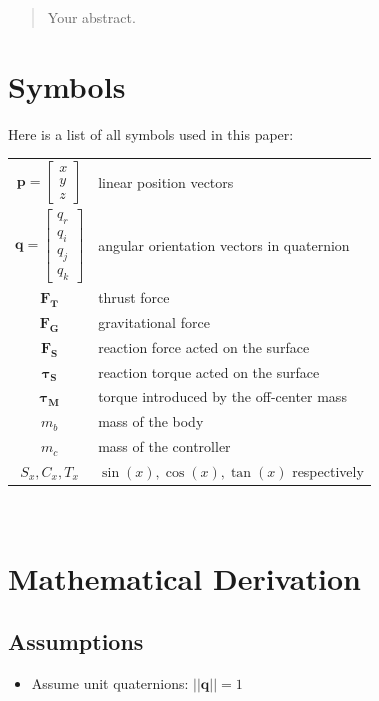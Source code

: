 \begin{abstract}
Your abstract.
\end{abstract}
\section{Symbols}
Here is a list of all symbols used in this paper:
\\
\begin{tabular}{c p{}}
  $\bm{p} = \begin{bmatrix}x \\ y \\ z \end{bmatrix}$ & linear position vectors \\
  $\bm{q} = \begin{bmatrix} q_r \\ q_i \\ q_j \\ q_k \end{bmatrix}$ & angular orientation vectors in quaternion \\
  $\bm{F_{T}}$ & thrust force \\
  $\bm{F_{G}}$ & gravitational force \\  
  $\bm{F_{S}}$ & reaction force acted on the surface \\
  $\bm{\tau_{S}}$ & reaction torque acted on the surface \\
  $\bm{\tau_{M}}$ & torque introduced by the off-center mass \\
  $m_b$ & mass of the body \\
  $m_c$ & mass of the controller \\
  $S_x, C_x, T_x$ & $\sin(x), \cos(x), \tan(x)$ respectively \\
\end{tabular}\\
\section{Mathematical Derivation}

\subsection{Assumptions}
\begin{itemize}
\item Assume unit quaternions: $||\bm{q}|| = 1$
\end{itemize}


